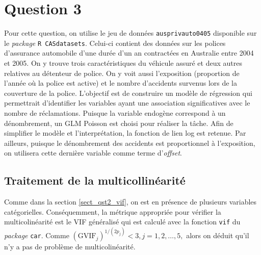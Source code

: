 \documentclass{article}
\begin{document}
	
\section{Question 3}
	Pour cette question, on utilise le jeu de données \texttt{ausprivauto0405} disponible sur le \textit{package} \texttt{R CASdatasets}. Celui-ci contient des données sur les polices d'assurance automobile d'une durée d'un an contractées en Australie entre 2004 et 2005. On y trouve trois caractéristiques du véhicule assuré et deux autres relatives au détenteur de police. On y voit aussi l'exposition (proportion de l'année où la police est active) et le nombre d'accidents survenus lors de la couverture de la police.
	L’objectif est de construire un modèle de régression qui permettrait d'identifier les variables ayant une association significatives avec le nombre de réclamations.
	Puisque la variable endogène correspond à un dénombrement, un GLM Poisson est choisi pour réaliser la tâche. Afin de simplifier le modèle et l'interprétation, la fonction de lien log est retenue. Par ailleurs, puisque le dénombrement des accidents est proportionnel à l'exposition, on utilisera cette dernière variable comme terme d'\textit{offset}.
	
	
	\subsection{Traitement de la multicollinéarité}
	Comme dans la section \ref{sect_qst2_vif}, on est en présence de plusieurs variables catégorielles. Conséquemment, la métrique appropriée pour vérifier la multicolinéarité est le VIF généralisé qui est calculé avec la fonction \texttt{vif} du \textit{package} \texttt{car}.
	Comme $(\mathrm{GVIF}_j)^{1/(2p_j)} < 3, j=1,2,\dots,5,$ alors on déduit qu'il n'y a pas de problème de multicolinéarité.

	
\end{document}
